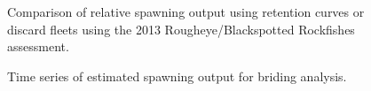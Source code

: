 \documentclass[
]{scrartcl}
\begin{document}
\begin{figure}[H]


\caption{\label{fig-Discard_comp_RSS}Comparison of relative spawning
output using retention curves or discard fleets using the 2013
Rougheye/Blackspotted Rockfishes assessment.}

\end{figure}%

\begin{figure}[H]


\caption{\label{fig-SO_Bridging}Time series of estimated spawning output
for briding analysis.}

\end{figure}%
\end{document}
